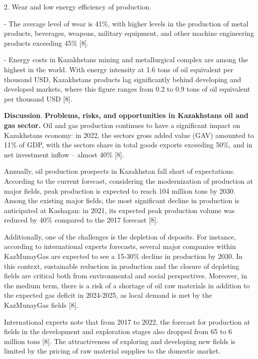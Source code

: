 \begin{multicols}{2}
2. Wear and low energy efficiency of production.

- The average level of wear is 41\%, with higher levels in the
production of metal products, beverages, weapons, military equipment,
and other machine engineering products exceeding 45\% {[}8{]}.

- Energy costs in Kazakhstan\textquotesingle s mining and metallurgical
complex are among the highest in the world. With energy intensity at 1.6
tons of oil equivalent per thousand USD, Kazakhstan\textquotesingle s
products lag significantly behind developing and developed markets,
where this figure ranges from 0.2 to 0.9 tons of oil equivalent per
thousand USD {[}8{]}.

{\bfseries Discussion}. {\bfseries Problems, risks, and opportunities in
Kazakhstan\textquotesingle s oil and gas sector.} Oil and gas production
continues to have a significant impact on Kazakhstan\textquotesingle s
economy: in 2022, the sector\textquotesingle s gross added value (GAV)
amounted to 11\% of GDP, with the sector\textquotesingle s share in
total goods exports exceeding 50\%, and in net investment inflow --
almost 40\% {[}8{]}.

Annually, oil production prospects in Kazakhstan fall short of
expectations. According to the current forecast, considering the
modernization of production at major fields, peak production is expected
to reach 104 million tons by 2030. Among the existing major fields, the
most significant decline in production is anticipated at Kashagan: in
2021, its expected peak production volume was reduced by 40\% compared
to the 2017 forecast {[}8{]}.

Additionally, one of the challenges is the depletion of deposits. For
instance, according to international experts\textquotesingle{}
forecasts, several major companies within KazMunayGas are expected to
see a 15-30\% decline in production by 2030. In this context,
sustainable reduction in production and the closure of depleting fields
are critical both from environmental and social perspectives. Moreover,
in the medium term, there is a risk of a shortage of oil raw materials
in addition to the expected gas deficit in 2024-2025, as local demand is
met by the KazMunayGas fields {[}8{]}.

International experts note that from 2017 to 2022, the forecast for
production at fields in the development and exploration stages also
dropped from 65 to 6 million tons {[}8{]}. The attractiveness of
exploring and developing new fields is limited by the pricing of raw
material supplies to the domestic market.


\end{multicols}

